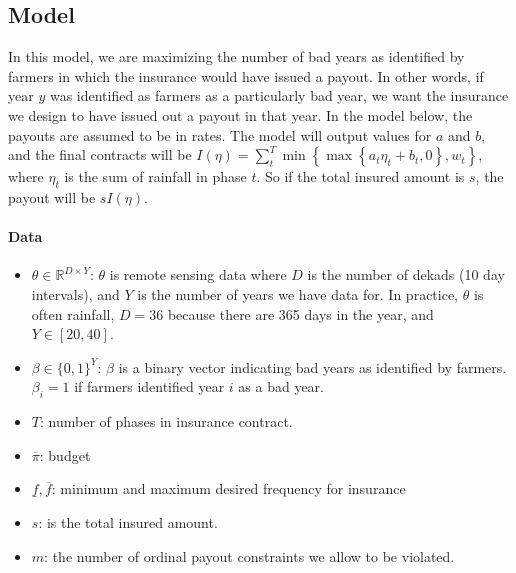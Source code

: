 \documentclass[11pt]{article}
\begin{document}
  \subsection{Model}
  In this model, we are maximizing the number of bad years as identified by farmers in which the insurance would have issued a payout. In other words, if year $y$ was identified as farmers as a particularly bad year, we want the insurance we design to have issued out a payout in that year. In the model below, the payouts are assumed to be in rates. The model will output values for $a$ and $b$, and the final contracts will be $I(\eta) = \sum_{t}^{T} \min \left \{ \max \left \{ a_t \eta_t + b_t, 0 \right \}, w_t \right \}$, where $\eta_t$ is the sum of rainfall in phase $t$. So if the total insured amount is $s$, the payout will be $sI(\eta)$.

    \paragraph{Data}
      \begin{itemize}
        \item $\theta \in \mathbb{R}^{D \times Y}$: $\theta$ is remote sensing data where $D$ is the number of dekads (10 day intervals), and $Y$ is the number of years we have data for. In practice, $\theta$ is often rainfall, $D=36$ because there are 365 days in the year, and $Y\in [20,40]$.
        \item $\beta \in \{ 0,1\}^Y$: $\beta$ is a binary vector indicating bad years as identified by farmers. $\beta_i = 1$ if farmers identified year $i$ as a bad year. 
        \item $T$: number of phases in insurance contract. 
        \item $\overline{\pi}$: budget 
        \item $\underline{f}, \overline{f}$: minimum and maximum desired frequency for insurance
        \item $s$: is the total insured amount. 
        \item $m$: the number of ordinal payout constraints we allow to be violated. 
      \end{itemize}
\end{document}
